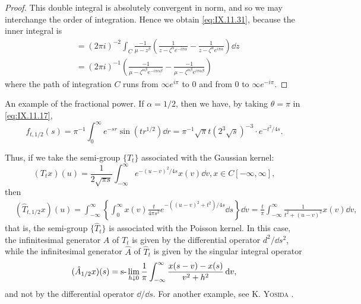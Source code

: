 \begin{proof}
This double integral is absolutely convergent in norm, and so we may interchange the order of integration. Hence we obtain \eqref{eq:IX.11.31}, because the inner integral is 
\[
\begin{aligned}
&= (2 \pi i) ^{-2} \int_{C} \frac {- 1}{\mu - z ^{\beta}} \left(\frac {1}{z - \zeta^{\alpha} e ^{- i \pi \alpha}} - \frac {1}{z - \zeta^{\alpha} e ^{i \pi \alpha}}\right) \dd z
\\
&= (2 \pi i) ^{-1} \left(\frac {- 1}{\mu - \zeta^{\alpha \beta} e ^{- i \pi \alpha \beta}} - \frac {- 1}{\mu - \zeta^{\alpha \beta} e ^{i \pi \alpha \beta}}\right)
\end{aligned}
\]
where the path of integration $C$ runs from $\infty e^{i\pi}$ to $0$ and from $0$ to $\infty e^{-i\pi}$.
\end{proof}

An example of the fractional power. If $\alpha = 1/2$, then we have, by taking $\theta = \pi$ in \eqref{eq:IX.11.17}, 
\begin{equation}\label{eq:IX.11.32}
f _{t,1/2} (s) = \pi^{-1} \int_{0} ^{\infty} e ^{-sr} \sin \left(t r ^{1/2}\right) \dd r = \pi^{-1} \sqrt {\pi} t \left(2 ^{3} \sqrt {s}\right) ^{-3} \cdot e ^ {- t ^{2} / 4 s}.
\end{equation}

Thus, if we take the semi-group $\{T_t\}$ associated with the Gaussian kernel: 
\[
\left(T _{t} x\right) (u) = \frac {1}{2 \sqrt {\pi s}} \int_{- \infty} ^{\infty} e ^ {- (u - v) ^{2} / 4 s} x (v) \dd v, x \in C [ - \infty , \infty ],
\]
then 
\[
\begin{aligned}
&\left(\hat {T} _{t,1/2} x\right) (u)  = \int_{- \infty} ^{\infty} \left\{\int_{0} ^{\infty} x (v) \frac {t}{4 \pi s ^{2}} e ^ {- ((u - v) ^{2} + t ^{2}) / 4 s} \dd s \right\} \dd v = \frac {t}{\pi} \int_{- \infty} ^{\infty} \frac {1}{t ^{2} + (u - v) ^{2}} x (v) \dd v,
\end{aligned}
\]
that is, the semi-group $\{\hat{T}_t\}$ is associated with the Poisson kernel. In this case, the infinitesimal generator $A$ of $T_{t}$ is given by the differential operator $d^2 /\dd s^2$, while the infinitesimal generator $\hat{A}$ of $\hat{T}_t$ is given by the singular integral operator 
\[
(\hat {A} _{1/2} x) (s) = \text{s-}\lim _{h \downarrow 0} \frac {1}{\pi} \int_{- \infty} ^{\infty} \frac {x (s - v) - x (s)}{v ^{2} + h ^{2}} \mathop{}\!\mathrm{d} v,
\]
and not by the differential operator $\dd/\dd s$. For another example, see K. \textsc{Yosida} \cite{yosida373}. 


\label{sec:IX.12}

